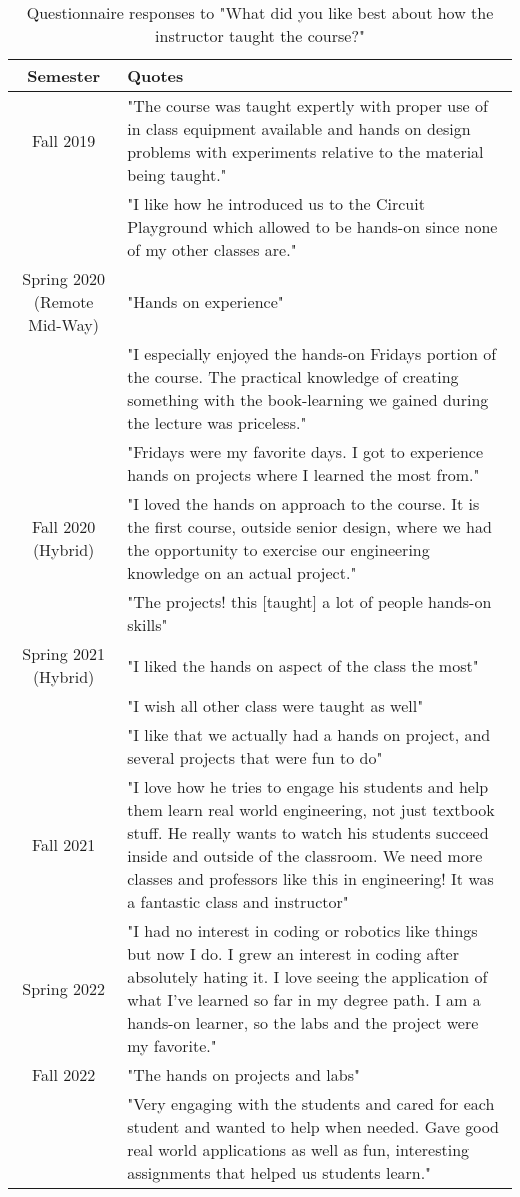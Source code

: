 \begin{table}[H]
    \centering
    \begin{tabular}{c|p{11cm}}
        Semester &  Quotes \\
        \hline 
        \hline
        Fall 2019 & "The course was taught expertly with proper use of in class equipment available and hands on design problems with experiments relative to the material being taught." \\
         & "I like how he introduced us to the Circuit Playground which allowed to be hands-on since none of my other classes are." \\
        \hline
        Spring 2020 (Remote Mid-Way) & "Hands on experience" \\
        & "I especially enjoyed the hands-on Fridays portion of the course. The practical knowledge of creating something with the book-learning we gained during the lecture was priceless."\\
        & "Fridays were my favorite days. I got to experience hands on projects where I learned the most from." \\
        \hline
        Fall 2020 (Hybrid) & "I loved the hands on approach to the course. It is the first course, outside senior design, where we had the opportunity to exercise our engineering knowledge on an actual project."\\
        & "The projects! this [taught] a lot of people hands-on skills" \\
        \hline
        Spring 2021 (Hybrid) & "I liked the hands on aspect of the class the most"\\
        & "I wish all other class were taught as well"\\
        & "I like that we actually had a hands on project, and several projects that were fun to do" \\
        \hline
        Fall 2021 & "I love how he tries to engage his students and help them learn real world engineering, not just textbook stuff. He really wants to watch his students succeed inside and outside of the classroom. We need more classes and professors like this in engineering! It was a fantastic class and instructor" \\
        \hline 
        Spring 2022 & "I had no interest in coding or robotics like things but now I do. I grew an interest in coding after absolutely hating it. I love seeing the application of what I've learned so far in my degree path. I am a hands-on learner, so the labs and the project were my favorite."\\
        \hline
        Fall 2022 & "The hands on projects and labs" \\ 
        & "Very engaging with the students and cared for each student and wanted to help when needed. Gave good real world applications as well as fun, interesting assignments that helped us students learn."
    \end{tabular}
    \caption{Questionnaire responses to "What did you like best about how the instructor taught the course?"}
    \label{tab:quotes}
\end{table}

